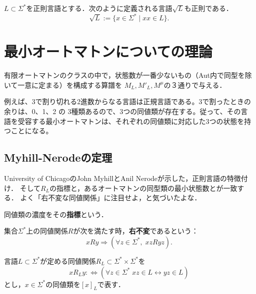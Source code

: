 \begin{theorem}
    $L\subset\Sigma^*$を正則言語とする．次のように定義される言語$\sqrt{L}$も正則である．
    \[\sqrt{L}:=\{x\in\Sigma^*\mid xx\in L\}.\]
\end{theorem}

\section{最小オートマトンについての理論}

\begin{tcolorbox}[colframe=ForestGreen, colback=ForestGreen!10!white, breakable]
    有限オートマトンのクラスの中で，状態数が一番少ないもの（Aut内で同型を除いて一意に定まる）を構成する算譜を
    $M_L,M'_L,M^\mu$の３通りで与える．
\end{tcolorbox}

\begin{example}
    例えば、3で割り切れる2進数からなる言語は正規言語である。3で割ったときの余りは、0、1、2 の 3種類あるので、3つの同値類が存在する。従って、その言語を受容する最小オートマトンは、それぞれの同値類に対応した3つの状態を持つことになる。
\end{example}

\subsection{Myhill-Nerodeの定理}

\begin{tcolorbox}[colframe=ForestGreen, colback=ForestGreen!10!white, breakable]
    University of ChicagoのJohn MyhillとAnil Nerodeが示した，正則言語の特徴付け．\cite{Nerode}
    そして$R_L$の指標と，あるオートマトンの同型類の最小状態数とが一致する．
    よく「右不変な同値関係」に注目せよ，と気づいたよな．
\end{tcolorbox}

\begin{definition}[index]
    同値類の濃度をその\textbf{指標}という．
\end{definition}

\begin{definition}
    集合$\Sigma^*$上の同値関係$R$が次を満たす時，\textbf{右不変}であるという：
    \[ xRy\Rightarrow (\forall z\in\Sigma^*,\;xzRyz). \]
\end{definition}

\begin{definition}
    言語$L\subset\Sigma^*$が定める同値関係$R_L\subset\Sigma^*\times\Sigma^*$を
    \[ xR_Ly:\Leftrightarrow (\forall z\in\Sigma^*\;xz\in L\leftrightarrow yz\in L) \]
    とし，$x\in\Sigma^*$の同値類を$[x]_L$で表す．
\end{definition}

